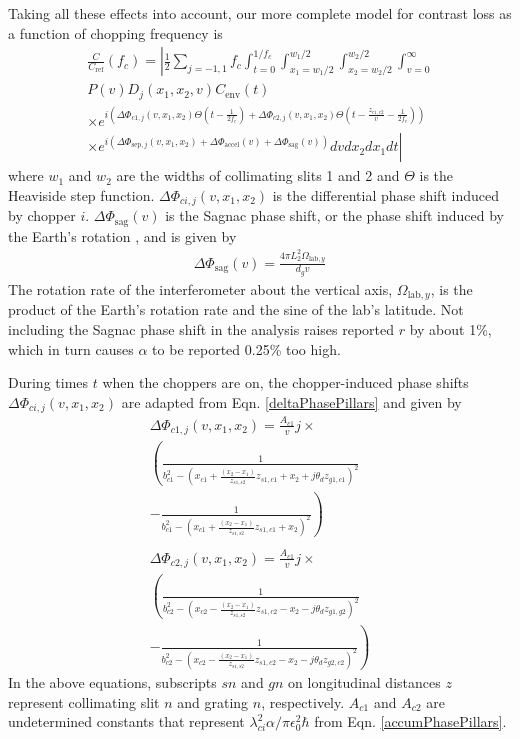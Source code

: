 \documentclass[twocolumn,prl,showpacs,superscriptaddress]{revtex4-1}   %
\newcommand{\eqnref}[1]{Eqn. \eqref{#1}}
\newcommand{\Omegalab}{\Omega_{\mathrm{lab},y}}
\newcommand{\dphisepj}{\Delta\Phi_{\mathrm{sep},j}}
\newcommand{\dphisag}{\Delta\Phi_{\mathrm{sag}}}
\newcommand{\dphiaccel}{\Delta\Phi_{\mathrm{accel}}}
\newcommand{\cenv}{C_{\mathrm{env}}}
\begin{document}
Taking all these effects into account, our more complete model for contrast loss as a function of chopping frequency is
\begin{align}
	\frac{C}{C_{\mathrm{ref}}}(f_c) = 
	\left|
		\frac{1}{2} \sum_{j=-1,1}
		f_c \int_{t=0}^{1/f_c} 
		\int_{x_1=w_1/2}^{w_1/2}
		\int_{x_2=w_2/2}^{w_2/2}
		\int_{v=0}^{\infty}           
		\right. \nonumber \\
		P(v)
		D_j(x_1, x_2, v)
		\cenv(t)                   
		\nonumber \\ \times
		e^{i\left( \Delta\Phi_{c1,j}(v,x_1,x_2)\Theta\left(t-\frac{1}{2f_c}\right) + \Delta\Phi_{c2,j}(v,x_1,x_2)\Theta\left(t-\frac{z_{c1,c2}}{v}-\frac{1}{2f_c}\right) \right)}
		\nonumber \\ \times \left.
		e^{i( \dphisepj(v,x_1,x_2) + \dphiaccel(v) + \dphisag(v) )}
		dv dx_{2} dx_{1} dt
	\right|
	\label{CvCF}
\end{align}
where $w_1$ and $w_2$ are the widths of collimating slits 1 and 2 and $\Theta$ is the Heaviside step function.
$\Delta\Phi_{ci,j}(v,x_1,x_2)$ is the differential phase shift induced by chopper $i$.
$\dphisag(v)$ is the Sagnac phase shift, or the phase shift induced by the Earth's rotation \cite{Lenef1997,Jacquey2008}, and is given by
\begin{align}
	\dphisag(v) = \frac{4\pi L_2^2\Omegalab}{d_g v}
	\label{phiSag}
\end{align}
The rotation rate of the interferometer about the vertical axis, $\Omegalab$, is the product of the Earth's rotation rate and the sine of the lab's latitude. Not including the Sagnac phase shift in the analysis raises reported $r$ by about 1\%, which in turn causes $\alpha$ to be reported 0.25\% too high.

During times $t$ when the choppers are on, the chopper-induced phase shifts $\Delta\Phi_{ci,j}(v,x_1,x_2)$ are adapted from \eqnref{deltaPhasePillars} and given by
\begin{align}
	\Delta\Phi_{c1,j}(v,x_1,x_2) = \frac{A_{c1}}{v}j \times \nonumber \\
	\left(
		\frac{1}{b_{c1}^2 -
			(x_{c1} + \frac{(x_2-x_1)}{z_{s1,s2}}z_{s1,c1} + x_2 + j\theta_d z_{g1,c1})^2
		}
		\right. \nonumber \\ - \left.
		\frac{1}{b_{c1}^2 -
			(x_{c1} + \frac{(x_2-x_1)}{z_{s1,s2}}z_{s1,c1} + x_2)^2
		}
	\right)
	\nonumber \\ 
	\nonumber \\	
	\Delta\Phi_{c2,j}(v,x_1,x_2) = \frac{A_{c1}}{v}j \times \nonumber \\
	\left(
		\frac{1}{b_{c2}^2 -
			(x_{c2} - \frac{(x_2-x_1)}{z_{s1,s2}}z_{s1,c2} - x_2 - j\theta_d z_{g1,g2})^2
		}
		\right. \nonumber \\ - \left.
		\frac{1}{b_{c2}^2 -
			(x_{c2} - \frac{(x_2-x_1)}{z_{s1,s2}}z_{s1,c2} - x_2 - j\theta_d z_{g2,c2})^2
		}
	\right)
	\label{phic1c2}
\end{align}
In the above equations, subscripts $sn$ and $gn$ on longitudinal distances $z$ represent collimating slit $n$ and grating $n$, respectively. $A_{c1}$ and $A_{c2}$ are undetermined constants that represent $\lambda_{ci}^2 \alpha / \pi \epsilon_0^2 \hbar$ from \eqnref{accumPhasePillars}. 
\end{document}
